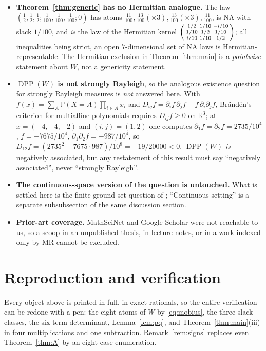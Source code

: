 \documentclass[11pt]{amsart}
\theoremstyle{remark}
\DeclareMathOperator{\DPP}{DPP}
\newcommand{\bbR}{\mathbb R}
\begin{document}
\begin{itemize}
\item \textbf{Theorem~\ref{thm:generic} has no Hermitian analogue.} The law
$(\tfrac12,\tfrac12,\tfrac12;\tfrac1{100},\tfrac1{100},\tfrac1{100};0)$ has atoms
$\tfrac{11}{100},\tfrac{13}{100}(\times3),\tfrac{13}{100}(\times3),\tfrac{11}{100}$, is NA
with slack $1/100$, and \emph{is} the law of the Hermitian kernel
$\begin{psmallmatrix}1/2&1/10&-i/10\\1/10&1/2&1/10\\ i/10&1/10&1/2\end{psmallmatrix}$; all
inequalities being strict, an open $7$-dimensional set of NA laws is Hermitian-representable.
The Hermitian exclusion in Theorem~\ref{thm:main} is a \emph{pointwise} statement about $W$,
not a genericity statement.
\item \textbf{$\DPP(W)$ is not strongly Rayleigh}, so the analogous existence question for
strongly Rayleigh measures is \emph{not} answered here. With
$f(x)=\sum_{A}\mathbb P(X=A)\prod_{i\in A}x_{i}$ and
$D_{ij}f=\partial_{i}f\,\partial_{j}f-f\,\partial_{i}\partial_{j}f$, Br\"and\'en's criterion
for multiaffine polynomials \cite{Branden} requires $D_{ij}f\ge0$ on $\bbR^{3}$; at
$x=(-4,-4,-2)$ and $(i,j)=(1,2)$ one computes
$\partial_{1}f=\partial_{2}f=2735/10^{4}$, $f=-7675/10^{4}$,
$\partial_{1}\partial_{2}f=-987/10^{4}$, so
$D_{12}f=(2735^{2}-7675\cdot987)/10^{8}=-19/20000<0$. $\DPP(W)$ \emph{is} negatively
associated, but any
restatement of this result must say ``negatively associated'', never ``strongly Rayleigh''.
\item \textbf{The continuous-space version of the question is untouched.} What is settled here
is the finite-ground-set question of \cite{Poinas}; ``Continuous setting'' is a separate
subsubsection of the same discussion section.
\item \textbf{Prior-art coverage.} MathSciNet and Google Scholar were not reachable to us, so
a scoop in an unpublished thesis, in lecture notes, or in a work indexed only by MR cannot be
excluded.
\end{itemize}

\section{Reproduction and verification}\label{sec:verify}

Every object above is printed in full, in exact rationals, so the entire verification can be
redone with a pen: the eight atoms of $W$ by \eqref{eq:mobius}, the three slack classes, the
six-term determinant, Lemma~\ref{lem:pq}, and Theorem~\ref{thm:main}(iii) in four
multiplications and one subtraction. Remark~\ref{rem:signs} replaces even
Theorem~\ref{thm:A} by an eight-case enumeration.
\end{document}
